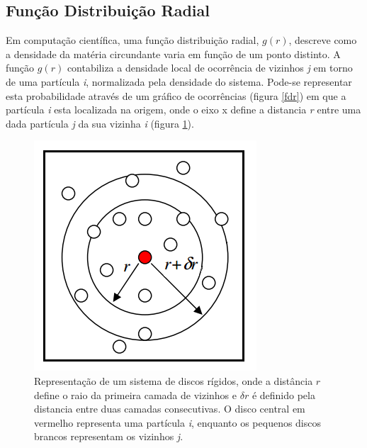 \documentclass[%
reprint,
amsmath,amssymb,
aps,
12pt
]{revtex4-1}
\begin{document}
	
	
\subsection*{Função Distribuição Radial }

Em computação científica, uma função distribuição radial, $ g(r) $, descreve como a densidade da matéria circundante varia em função de um ponto distinto. A função $ g(r) $ contabiliza a densidade local de ocorrência de vizinhos \textit{j} em torno de uma partícula \textit{i}, normalizada pela densidade do sistema. Pode-se representar esta probabilidade através de um gráfico de ocorrências (figura \ref{fdr}) em que a partícula \textit{i} esta localizada na origem, onde o eixo x define a distancia \textit{r} entre uma dada partícula \textit{j} da sua vizinha \textit{i} (figura \ref{fdr1}).

\begin{figure}[!h]
	\centering
	\includegraphics[scale=0.5]{fdr1.png}
	\caption{Representação de um sistema de discos rígidos, onde a distância $r$ define o raio da primeira camada de vizinhos e $ \delta r$ é definido pela distancia entre duas camadas consecutivas. O disco central em vermelho representa uma partícula \textit{i}, enquanto os pequenos discos brancos representam os vizinhos \textit{j}.
		\label{fdr1}}
\end{figure}
\end{document}
